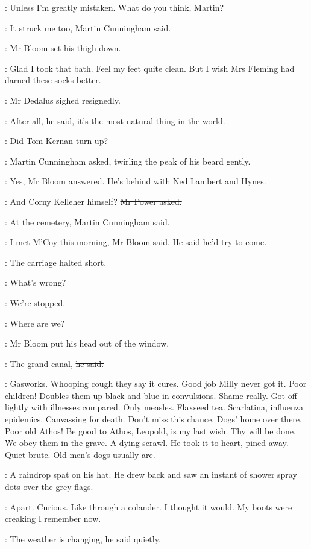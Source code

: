 \simon:
Unless I'm greatly mistaken.
What do you think, Martin?

\cunningham:
It struck me too,
\sout{Martin Cunningham said.}

:
Mr Bloom set his thigh down.

\BloomInt:
Glad I took that bath.
Feel my feet quite clean.
But I wish Mrs Fleming had darned these socks better.

:
Mr Dedalus sighed resignedly.

\simon:
After all,
\sout{he said,}
it's the most natural thing in the world.

\cunningham:
Did Tom Kernan turn up?

:
Martin Cunningham asked,
twirling the peak of his beard gently.

\Bloom:
Yes,
\sout{Mr Bloom answered.}
He's behind with Ned Lambert and Hynes.

\power:
And Corny Kelleher himself?
\sout{Mr Power asked.}

\cunningham:
At the cemetery,
\sout{Martin Cunningham said.}

\Bloom:
I met M'Coy this morning,
\sout{Mr Bloom said.}
He said he'd try to come.

:
The carriage halted short.

\simon:
What's wrong?

\power:
We're stopped.

\cunningham:
Where are we?

:
Mr Bloom put his head out of the window.

\Bloom:
The grand canal,
\sout{he said.}

\BloomInt:
Gasworks.
Whooping cough they say it cures.
Good job Milly never got it.
Poor children!
Doubles them up black and blue in convulsions.
Shame really.
Got off lightly with illnesses compared.
Only measles.
Flaxseed tea.
Scarlatina, influenza epidemics.
Canvassing for death.
Don't miss this chance.
Dogs' home over there.
Poor old Athos!
Be good to Athos, Leopold, is my last wish.
Thy will be done.
We obey them in the grave.
A dying scrawl.
He took it to heart, pined away.
Quiet brute.
Old men's dogs usually are.

:
A raindrop spat on his hat.
He drew back and saw an instant of shower spray dots over the grey flags.

\BloomInt:
Apart.
Curious.
Like through a colander.
I thought it would.
My boots were creaking I remember now.

\Bloom:
The weather is changing,
\sout{he said quietly.}

